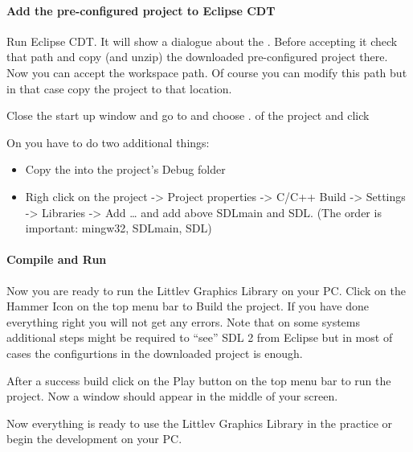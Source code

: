 \documentclass[letterpaper,10pt,english]{sphinxmanual}
\begin{document}
\paragraph{Add the pre-configured project to Eclipse CDT}
\label{\detokenize{get-started/pc-simulator:add-the-pre-configured-project-to-eclipse-cdt}}
Run Eclipse CDT. It will show a dialogue about the . Before accepting it check that path and copy (and unzip) the downloaded pre-configured project there. Now you can accept the workspace path. Of course you can modify this path but in that case copy the project to that location.

Close the start up window and go to  and choose .  of the project and click 

On  you have to do two additional things:
\begin{itemize}
\item {} 
Copy the  into the project’s Debug folder

\item {} 
Righ click on the project -\textgreater{} Project properties -\textgreater{} C/C++ Build -\textgreater{} Settings -\textgreater{} Libraries -\textgreater{} Add … and add  above SDLmain and SDL. (The order is important: mingw32, SDLmain, SDL)

\end{itemize}


\paragraph{Compile and Run}
\label{\detokenize{get-started/pc-simulator:compile-and-run}}
Now you are ready to run the Littlev Graphics Library on your PC. Click on the Hammer Icon on the top menu bar to Build the project. If you have done everything right you will not get any errors. Note that on some systems additional steps might be required to “see” SDL 2 from Eclipse but in most of cases the configurtions in the downloaded project is enough.

After a success build click on the Play button on the top menu bar to run the project. Now a window should appear in the middle of your screen.

Now everything is ready to use the Littlev Graphics Library in the practice or begin the development on your PC.
\end{document}
